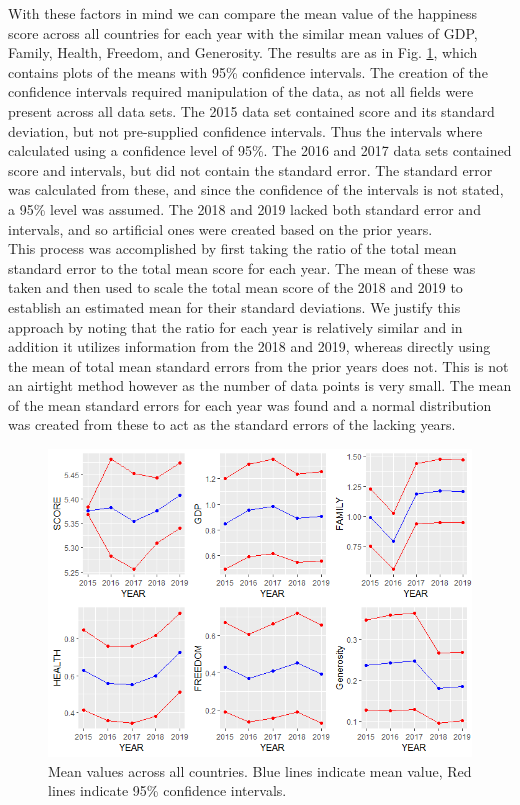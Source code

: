 \documentclass{article}
\begin{document}
With these factors in mind we can compare the mean value of the happiness score across all countries for each year with the similar mean values of GDP, Family, Health, Freedom, and Generosity. The results are as in Fig. \ref{fig:time_pred}, which contains plots of the means with 95\% confidence intervals. The creation of the confidence intervals required manipulation of the data, as not all fields were present across all data sets. The 2015 data set contained score and its standard deviation, but not pre-supplied confidence intervals. Thus the intervals where calculated using a confidence level of 95\%. The 2016 and 2017 data sets contained score and intervals, but did not contain the standard error. The standard error was calculated from these, and since the confidence of the intervals is not stated, a 95\% level was assumed. The 2018 and 2019 lacked both standard error and intervals, and so artificial ones were created based on the prior years.\\

This process was accomplished by first taking the ratio of the total mean standard error to the total mean score for each year. The mean of these was taken and then used to scale the total mean score of the 2018 and 2019 to establish an estimated mean for their standard deviations. We justify this approach by noting that the ratio for each year is relatively similar and in addition it utilizes information from the 2018 and 2019, whereas directly using the mean of total mean standard errors from the prior years does not. This is not an airtight method however as the number of data points is very small. The mean of the mean standard errors for each year was found and a normal distribution was created from these to act as the standard errors of the lacking years.

\begin{figure}[H]
    \centering
    \includegraphics[width=12cm]{Regional_Mean/RplotA.png}
    \caption{Mean values across all countries. Blue lines indicate mean value, Red lines indicate 95\% confidence intervals.}
    \label{fig:time_pred}
\end{figure}
\end{document}
